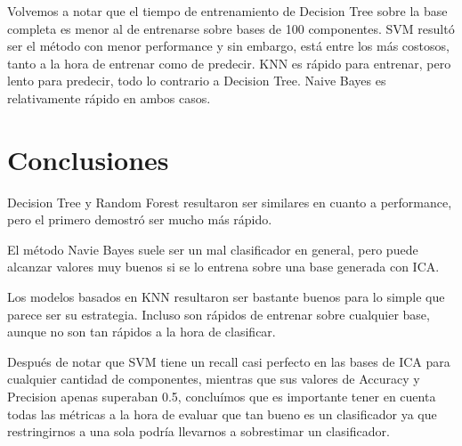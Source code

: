 \documentclass[10pt, a4paper]{article}
\begin{document}
Volvemos a notar que el tiempo de entrenamiento de Decision Tree sobre la base completa es menor al de entrenarse sobre bases de 100 componentes. SVM resultó ser el método con menor performance y sin embargo, está entre los más costosos, tanto a la hora de entrenar como de predecir. KNN es rápido para entrenar, pero lento para predecir, todo lo contrario a Decision Tree. Naive Bayes es relativamente rápido en ambos casos.

\section{Conclusiones}

Decision Tree y Random Forest resultaron ser similares en cuanto a performance, pero el primero demostró ser mucho más rápido.

El método Navie Bayes suele ser un mal clasificador en general, pero puede alcanzar valores muy buenos si se lo entrena sobre una base generada con ICA.

Los modelos basados en KNN resultaron ser bastante buenos para lo simple que parece ser su estrategia. Incluso son rápidos de entrenar sobre cualquier base, aunque no son tan rápidos a la hora de clasificar.

Después de notar que SVM tiene un recall casi perfecto en las bases de ICA para cualquier cantidad de componentes,
mientras que sus valores de Accuracy y Precision apenas superaban 0.5, concluímos que es importante tener en cuenta todas las métricas a
la hora de evaluar que tan bueno es un clasificador ya que restringirnos a una sola podría llevarnos a sobrestimar un clasificador.
\end{document}

